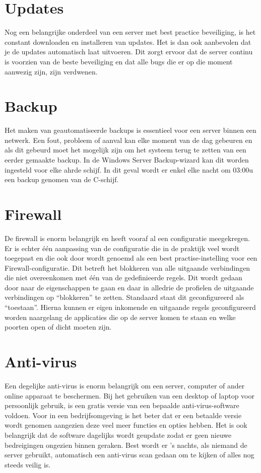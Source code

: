 \documentclass[pdftex,a4paper,12pt]{report}
\begin{document}
\section{Updates}
Nog een belangrijke onderdeel van een server met best practice beveiliging, is het constant downloaden en installeren van updates. Het is dan ook aanbevolen dat je de updates automatisch laat uitvoeren. Dit zorgt ervoor dat de server continu is voorzien van de beste beveiliging en dat alle bugs die er op die moment aanwezig zijn, zijn verdwenen. 

\section{Backup}
Het maken van geautomatiseerde backups is essentieel voor een server binnen een netwerk. Een fout, probleem of aanval kan elke moment van de dag gebeuren en als dit gebeurd moet het mogelijk zijn om het systeem terug te zetten van een eerder gemaakte backup. In de Windows Server Backup-wizard kan dit worden ingesteld voor elke ahrde schijf. In dit geval wordt er enkel elke nacht om 03:00u een backup genomen van de C-schijf. 

\section{Firewall}
De firewall is enorm belangrijk en heeft vooraf al een configuratie meegekregen. Er is echter één aanpassing van de configuratie die in de praktijk veel wordt toegepast en die ook door \cite{Nabors2013} wordt genoemd als een best practise-instelling voor een Firewall-configuratie. Dit betreft het blokkeren van alle uitgaande verbindingen die niet overeenkomen met één van de gedefinieerde regels. Dit wordt gedaan door naar de eigenschappen te gaan en daar in alledrie de profielen de uitgaande verbindingen op "`blokkeren"' te zetten. Standaard staat dit geconfigureerd als "`toestaan"'. Hierna kunnen er eigen inkomende en uitgaande regels geconfigureerd worden naargelang de applicaties die op de server komen te staan en welke poorten open of dicht moeten zijn.

\section{Anti-virus}
Een degelijke anti-virus is enorm belangrijk om een server, computer of ander online apparaat te beschermen. Bij het gebruiken van een desktop of laptop voor persoonlijk gebruik, is een gratis versie van een bepaalde anti-virus-software voldoen. Voor in een bedrijfsomgeving is het beter dat er een betaalde versie wordt genomen aangezien deze veel meer functies en opties hebben. Het is ook belangrijk dat de software dagelijks wordt geupdate zodat er geen nieuwe bedreigingen ongezien binnen geraken. Best wordt er 's nachts, als niemand de server gebruikt, automatisch een anti-virus scan gedaan om te kijken of alles nog steeds veilig is.
\end{document}
